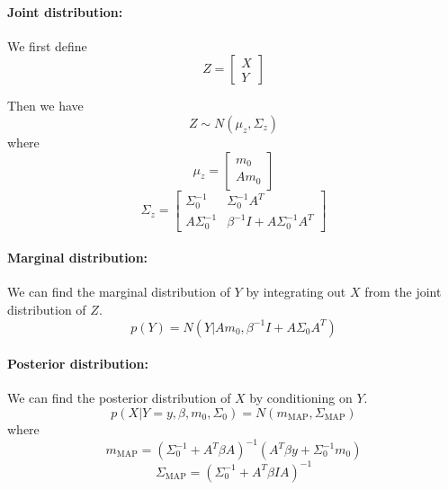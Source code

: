 \documentclass[a4paper,12pt]{article}
\begin{document}
\paragraph{Joint distribution:}
We first define
\begin{equation*}
	Z = \begin{bmatrix}
		X \\
		Y
	\end{bmatrix}
\end{equation*}

Then we have
\begin{equation*}
	Z \sim N(\mu_z, \Sigma_z)
\end{equation*}
where
\begin{equation*}
	\mu_z = \begin{bmatrix}
		m_0 \\
		Am_0
	\end{bmatrix}
\end{equation*}
\begin{equation*}
	\Sigma_z = \begin{bmatrix}
		\Sigma_0^{-1} & \Sigma_0^{-1} A^T \\
		A \Sigma_0^{-1} & \beta^{-1} I + A \Sigma_0^{-1} A^T
	\end{bmatrix}
\end{equation*}

\paragraph{Marginal distribution:}
We can find the marginal distribution of $Y$ by integrating out $X$ from the joint distribution of $Z$.
\begin{equation*}
	p(Y) = N(Y|Am_0, \beta^{-1} I + A \Sigma_0 A^T)
\end{equation*}

\paragraph{Posterior distribution:}
We can find the posterior distribution of $X$ by conditioning on $Y$.
\begin{equation*}
	p(X|Y=y, \beta, m_0, \Sigma_0) = N(m_\text{MAP}, \Sigma_\text{MAP})
\end{equation*}
where
\begin{equation*}
	m_\text{MAP} = (\Sigma_0^{-1} + A^T \beta A)^{-1} (A^T \beta y + \Sigma_0^{-1} m_0)
\end{equation*}
\begin{equation*}
	\Sigma_\text{MAP} = (\Sigma_0^{-1} + A^T \beta I A)^{-1}
\end{equation*}
\end{document}
